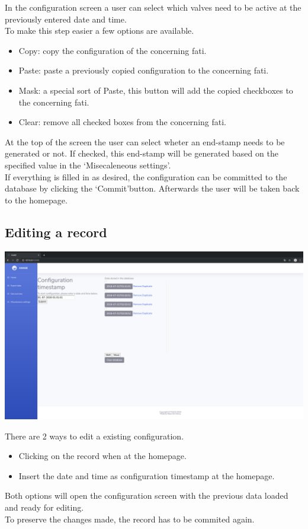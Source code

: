 \documentclass[12pt]{article}
\begin{document}
In the configuration screen a user can select which valves need to be active at the previously entered date and time.\\
To make this step easier a few options are available.
\begin{itemize}
	\item Copy: copy the configuration of the concerning fati.
	\item Paste: paste a previously copied configuration to the concerning fati.
	\item Mask: a special sort of Paste, this button will add the copied checkboxes to the concerning fati.
	\item Clear: remove all checked boxes from the concerning fati.
\end{itemize}
At the top of the screen the user can select wheter an end-stamp needs to be generated or not. If checked, this end-stamp will be generated based on the specified value in the \lq Misecaleneous settings\rq.\\
If everything is filled in as desired, the configuration can be committed to the database by clicking the \lq Commit\rq button. Afterwards the user will be taken back to the homepage.

\subsection{Editing a record}
\begin{center}
	\includegraphics[width=\linewidth]{images/Edit_options.png}
\end{center}
There are 2 ways to edit a existing configuration.
\begin{itemize}
	\item Clicking on the record when at the homepage.
	\item Insert the date and time as configuration timestamp at the homepage.
\end{itemize}
Both options will open the configuration screen with the previous data loaded and ready for editing.\\
To preserve the changes made, the record has to be commited again.
\end{document}
